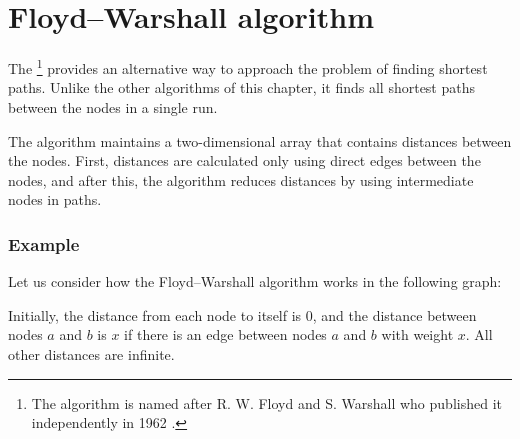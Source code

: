 \section{Floyd–Warshall algorithm}


The \footnote{The algorithm
is named after R. W. Floyd and S. Warshall
who published it independently in 1962 \cite{flo62,war62}.}
provides an alternative way to approach the problem
of finding shortest paths.
Unlike the other algorithms of this chapter,
it finds all shortest paths between the nodes
in a single run.

The algorithm maintains a two-dimensional array
that contains distances between the nodes.
First, distances are calculated only using
direct edges between the nodes,
and after this, the algorithm reduces distances
by using intermediate nodes in paths.

\subsubsection{Example}

Let us consider how the Floyd–Warshall algorithm
works in the following graph:

\begin{center}
\end{center}

Initially, the distance from each node to itself is $0$,
and the distance between nodes $a$ and $b$ is $x$
if there is an edge between nodes $a$ and $b$ with weight $x$.
All other distances are infinite.

